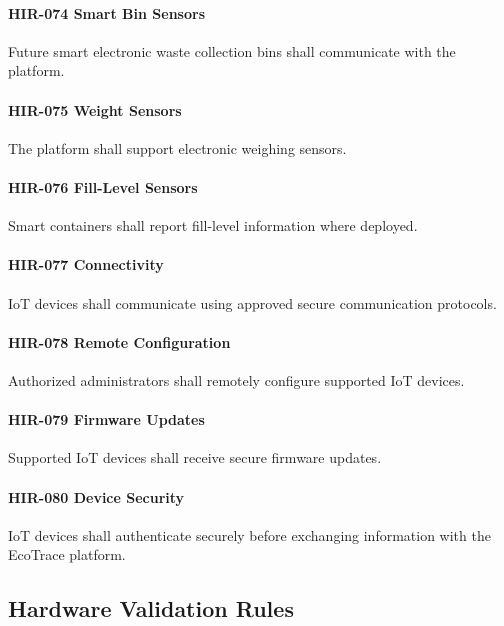 \paragraph{HIR-074 Smart Bin Sensors}

Future smart electronic waste collection bins shall communicate with
the platform.

\paragraph{HIR-075 Weight Sensors}

The platform shall support electronic weighing sensors.

\paragraph{HIR-076 Fill-Level Sensors}

Smart containers shall report fill-level information where deployed.

\paragraph{HIR-077 Connectivity}

IoT devices shall communicate using approved secure communication
protocols.

\paragraph{HIR-078 Remote Configuration}

Authorized administrators shall remotely configure supported IoT
devices.

\paragraph{HIR-079 Firmware Updates}

Supported IoT devices shall receive secure firmware updates.

\paragraph{HIR-080 Device Security}

IoT devices shall authenticate securely before exchanging information
with the EcoTrace platform.


\subsection*{Hardware Validation Rules}

